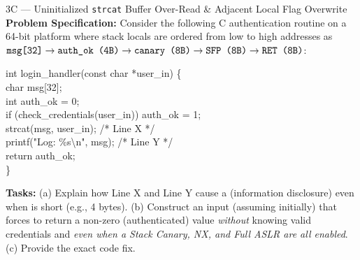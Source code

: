 \begin{templatebox}{3C --- Uninitialized \texttt{strcat} Buffer Over-Read \& Adjacent Local Flag Overwrite}
\textbf{Problem Specification:} Consider the following C authentication routine on a 64-bit platform where stack locals are ordered from low to high addresses as $\texttt{msg[32]} \to \texttt{auth\_ok (4B)} \to \texttt{canary (8B)} \to \texttt{SFP (8B)} \to \texttt{RET (8B)}$:
\begin{codeblock}
int login\_handler(const char *user\_in) \{\\
\hspace*{1.5em} char msg[32];\\
\hspace*{1.5em} int auth\_ok = 0;\\
\hspace*{1.5em} if (check\_credentials(user\_in)) auth\_ok = 1;\\
\hspace*{1.5em} strcat(msg, user\_in); \hspace*{2.0em} /* Line X */\\
\hspace*{1.5em} printf("Log: \%s\textbackslash n", msg); \hspace*{1.0em} /* Line Y */\\
\hspace*{1.5em} return auth\_ok;\\
\}
\end{codeblock}
\textbf{Tasks:} (a) Explain how Line X and Line Y cause a  (information disclosure) even when  is short (e.g., 4 bytes). (b) Construct an input  (assuming  initially) that forces  to return a non-zero (authenticated) value \emph{without} knowing valid credentials and \emph{even when a Stack Canary, NX, and Full ASLR are all enabled}. (c) Provide the exact code fix.


\end{templatebox}
